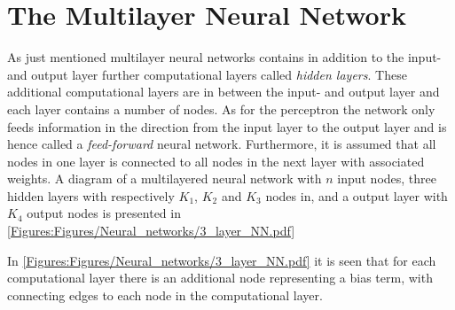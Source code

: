 \section{The Multilayer Neural Network}
As just mentioned multilayer neural networks contains in addition to the input- and output layer further computational layers called \emph{hidden layers}. These additional computational layers are in between the input- and output layer and each layer contains a number of nodes. As for the perceptron the network only feeds information in the direction from the input layer to the output layer and is hence called a \emph{feed-forward} neural network. Furthermore, it is assumed that all nodes in one layer is connected to all nodes in the next layer with associated weights. A diagram of a multilayered neural network with $n$ input nodes, three hidden layers with respectively $K_1$, $K_2$ and $K_3$ nodes in, and a output layer with $K_4$ output nodes is presented in \autoref{Figures:Figures/Neural_networks/3_layer_NN.pdf}

In \autoref{Figures:Figures/Neural_networks/3_layer_NN.pdf} it is seen that for each computational layer there is an additional node representing a bias term, with connecting edges to each node in the computational layer.

